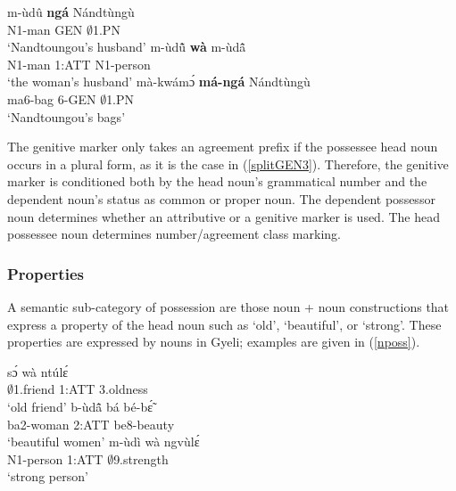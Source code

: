 \begin{exe}
\ex\label{splitGEN}
\begin{xlist}
\ex \label{splitGEN1}
  \gll     m-ùdû {\bfseries ngá} Nándtùngù \\
               N1-man GEN $\emptyset$1.PN  \\
    \trans `Nandtoungou's husband'
\ex \label{splitGEN2}
  \gll     m-ùdũ̂ {\bfseries wà} m-ùdã̂ \\
               N1-man 1:ATT N1-person  \\
    \trans `the woman's husband'
\ex \label{splitGEN3}
  \gll    mà-kwámɔ́  {\bfseries má-ngá} Nándtùngù \\
               ma6-bag 6-GEN $\emptyset$1.PN  \\
    \trans `Nandtoungou's bags'
\end {xlist}
\end{exe}

\noindent The genitive marker only takes an agreement prefix if the possessee head noun occurs in a plural form, as it is the case in (\ref{splitGEN3}). Therefore, the genitive marker is conditioned both by the head noun's grammatical number and the dependent noun's status as common or proper noun. The dependent possessor noun determines whether an attributive or a genitive marker is used. The head possessee noun determines number/agreement class marking.


\subsubsection{Properties}  
\label{sec:PROP}

A semantic sub-category of possession are those noun + noun constructions that express a property of the head noun such as `old', `beautiful', or `strong'. These properties are expressed by nouns in Gyeli; examples are given in (\ref{nposs}).

\begin{exe}
\ex\label{nposs}
\begin{xlist}
\ex \label{nposs1}
  \gll     sɔ́ wà ntúlɛ́ \\
               $\emptyset$1.friend 1:ATT 3.oldness  \\
    \trans `old friend'
\ex \label{nposs2}
  \gll     b-ùdã̂ bá bé-bɛ̃́  \\
               ba2-woman 2:ATT be8-beauty \\
    \trans `beautiful women'
\ex \label{nposs3}
  \gll    m-ùdì wà ngvùlɛ́ \\
               N1-person 1:ATT $\emptyset$9.strength \\
    \trans `strong person'
\end {xlist}
\end{exe}


